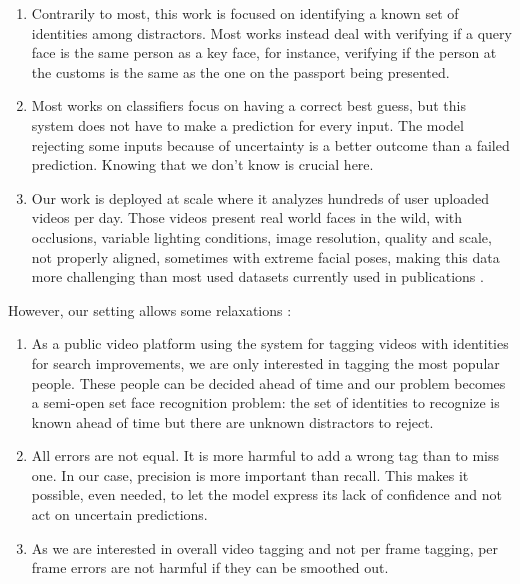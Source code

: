 \begin{enumerate}
    \item Contrarily to most, this work is focused on identifying a known set of identities among distractors. Most works instead deal with verifying if a query face is the same person as a key face, for instance, verifying if the person at the customs is the same as the one on the passport being presented.
    
    \item Most works on classifiers focus on having a correct best guess, but this system does not have to make a prediction for every input. The model rejecting some inputs because of uncertainty is a better outcome than a failed prediction. Knowing that we don't know is crucial here.

    \item Our work is deployed at scale where it analyzes hundreds of user uploaded videos per day. Those videos present real world faces in the wild, with occlusions, variable lighting conditions, image resolution, quality and scale, not properly aligned, sometimes with extreme facial poses, making this data more challenging than most used datasets currently used in publications \citep{celeb1m}.
\end{enumerate}

However, our setting allows some relaxations :

\begin{enumerate}
    \item As a public video platform using the system for tagging videos with identities for search improvements, we are only interested in tagging the most popular people. These people can be decided ahead of time and our problem becomes a semi-open set face recognition problem: the set of identities to recognize is known ahead of time but there are unknown distractors to reject.

    \item All errors are not equal. It is more harmful to add a wrong tag than to miss one. In our case, precision is more important than recall. This makes it possible, even needed, to let the model express its lack of confidence and not act on uncertain predictions.

    \item As we are interested in overall video tagging and not per frame tagging, per frame errors are not harmful if they can be smoothed out.
\end{enumerate}

